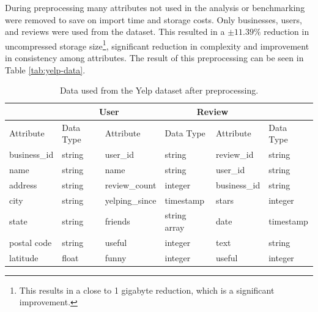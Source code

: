During preprocessing many attributes not used in the analysis or benchmarking were removed to save on import time and storage costs. Only businesses, users, and reviews were used from the dataset. This resulted in a $\pm11.39\%$ reduction in uncompressed storage size\footnote{This results in a close to 1 gigabyte reduction, which is a significant improvement.}, significant reduction in complexity and improvement in consistency among attributes. The result of this preprocessing can be seen in Table \ref{tab:yelp-data}.

\begin{table}[h]
    \centering
    \caption{Data used from the Yelp dataset after preprocessing.}
    \vspace*{5mm}
    \begin{tabular}{ |p{2cm}|p{2cm}||p{2cm}|p{2cm}||p{2cm}|p{2cm}|}
        \hline
        \rowcolor{Gray}
        \multicolumn{2}{|c||}{Business} & \multicolumn{2}{|c||}{User} & \multicolumn{2}{|c|}{Review}                                           \\
        \hline
        \rowcolor{LightGray}
        Attribute                       & Data Type                   & Attribute                    & Data Type    & Attribute    & Data Type \\
        \hline
        business\_id                    & string                      & user\_id                     & string       & review\_id   & string    \\
        name                            & string                      & name                         & string       & user\_id     & string    \\
        address                         & string                      & review\_count                & integer      & business\_id & string    \\
        city                            & string                      & yelping\_since               & timestamp    & stars        & integer   \\
        state                           & string                      & friends                      & string array & date         & timestamp \\
        postal code                     & string                      & useful                       & integer      & text         & string    \\
        latitude                        & float                       & funny                        & integer      & useful       & integer   \\

\end{tabular}
\end{table}
